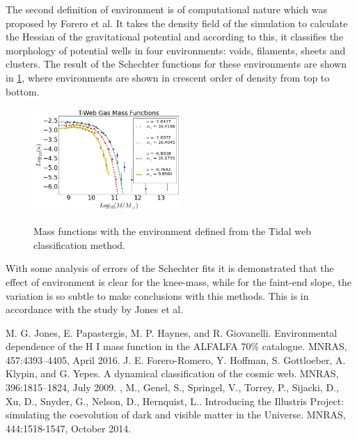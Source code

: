 \documentclass[preprint,proceedings]{rmaa}
\begin{document}
The second definition of environment is of computational nature which was proposed by Forero et al. It takes the density field of the simulation to calculate the Hessian of the gravitational potential and according to this, it classifies the morphology of potential wells in four environments: voids, filaments, sheets and clusters. The result of the Schechter functions for these environments are shown in \ref{fig2}, where environments are shown in crescent order of density from top to bottom.

\begin{figure}[h!]
\centering
\includegraphics[width=0.5\textwidth]{environment2}
\label{fig2}
\caption{Mass functions with the environment defined from the Tidal
  web classification method.}
\centering
\end{figure}

 With some analysis of errors of the Schechter fits it is demonstrated that the effect of environment is clear for the knee-mass, while for the faint-end slope, the variation is so subtle to make conclusions with this methods. This is in accordance with the study by Jones et al. \\

 
\begin{thebibliography}
M. G. Jones, E. Papastergis, M. P. Haynes, and R. Giovanelli. Environmental dependence of the H I mass function in the ALFALFA 70\% catalogue. MNRAS, 457:4393–4405, April 2016.
J. E. Forero-Romero, Y. Hoffman, S. Gottloeber, A. Klypin, and G. Yepes. A dynamical classification of the cosmic web. MNRAS, 396:1815–1824, July 2009.
, M., {Genel}, S.,
  {Springel}, V., {Torrey}, P.,  {Sijacki}, D., {Xu}, D.,
  {Snyder}, G., {Nelson}, D., {Hernquist}, L.. Introducing the
  Illustris Project: simulating the coevolution of dark and visible
  matter in the Universe. MNRAS, 444:1518-1547, October 2014.
\end{thebibliography}
\end{document}
